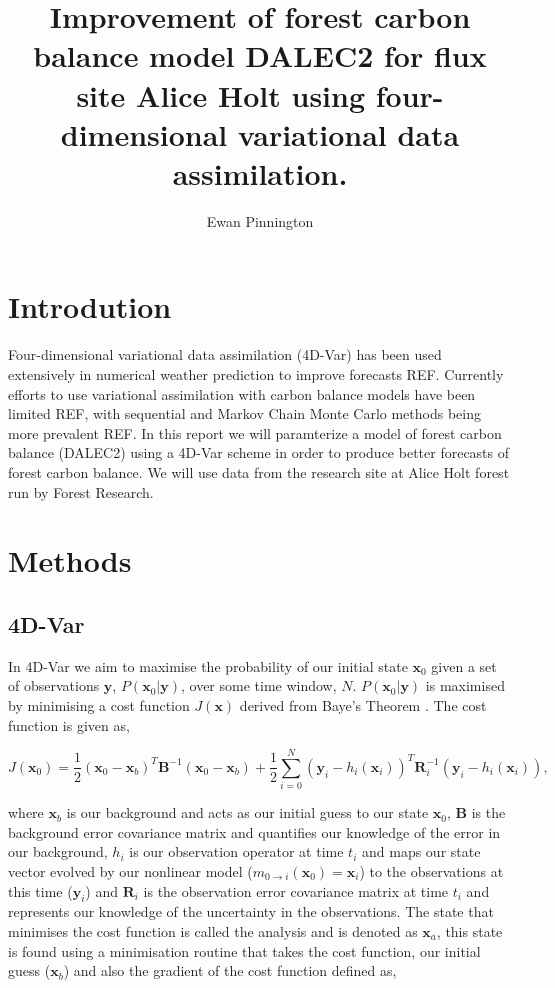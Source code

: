 \documentclass[11pt]{article}
\title{Improvement of forest carbon balance model DALEC2 for flux site Alice Holt using four-dimensional variational data assimilation.}
\author{Ewan Pinnington}
\begin{document}
\maketitle

\section{Introdution}

Four-dimensional variational data assimilation (4D-Var) has been used extensively in numerical weather prediction to improve forecasts REF. Currently efforts to use variational assimilation with carbon balance models have been limited REF, with sequential and Markov Chain Monte Carlo methods being more prevalent REF. In this report we will paramterize a model of forest carbon balance (DALEC2) using a 4D-Var scheme in order to produce better forecasts of forest carbon balance. We will use data from the research site at Alice Holt forest run by Forest Research.  

\section{Methods}

\subsection{4D-Var}

In 4D-Var we aim to maximise the probability of our initial state $\textbf{x}_0$ given a set of observations $\textbf{y}$, $P(\textbf{x}_0|\textbf{y})$, over some time window, $N$. $P(\textbf{x}_0|\textbf{y})$ is maximised by minimising a cost function $J(\textbf{x})$ derived from Baye's Theorem \citep{lewis2006dynamic}. The cost function is given as,

\begin{equation}
J(\textbf{x}_0) = \frac{1}{2}(\textbf{x}_0-\textbf{x}_b)^{T}\textbf{B}^{-1}(\textbf{x}_0-\textbf{x}_b)+\frac{1}{2}\sum_{i=0}^{N}(\textbf{y}_i-h_i(\textbf{x}_i))^{T}\textbf{R}_{i}^{-1}(\textbf{y}_i-h_i(\textbf{x}_i)),
\end{equation}

where $\textbf{x}_b$ is our background and acts as our initial guess to our state $\textbf{x}_0$, $\textbf{B}$ is the background error covariance matrix and quantifies our knowledge of the error in our background, $h_i$ is our observation operator at time $t_i$ and maps our state vector evolved by our nonlinear model ($m_{0\rightarrow i}(\mathbf{x}_{0})=\textbf{x}_i$) to the observations at this time ($\textbf{y}_i$) and $\textbf{R}_i$ is the observation error covariance matrix at time $t_i$ and represents our knowledge of the uncertainty in the observations. The state that minimises the cost function is called the analysis and is denoted as $\textbf{x}_a$, this state is found using a minimisation routine that takes the cost function, our initial guess ($\textbf{x}_b$) and also the gradient of the cost function defined as,
\end{document}
